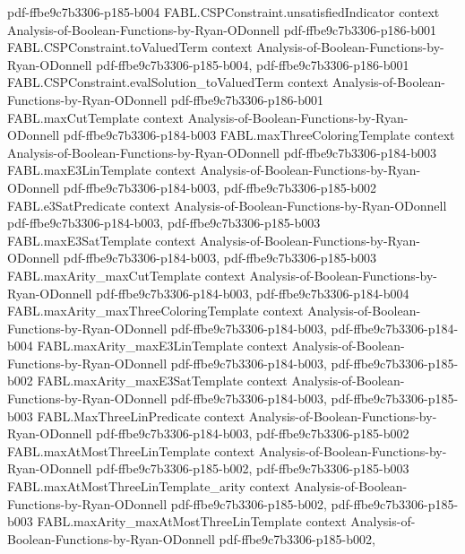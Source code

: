 \begin{theorem}
  {pdf-ffbe9c7b3306-p185-b004}
\proofstep
  {FABL.CSPConstraint.unsatisfiedIndicator}
  {context}
  {Analysis-of-Boolean-Functions-by-Ryan-ODonnell}
  {pdf-ffbe9c7b3306-p186-b001}
\proofstep
  {FABL.CSPConstraint.toValuedTerm}
  {context}
  {Analysis-of-Boolean-Functions-by-Ryan-ODonnell}
  {pdf-ffbe9c7b3306-p185-b004,
    pdf-ffbe9c7b3306-p186-b001}
\proofstep
  {FABL.CSPConstraint.evalSolution_toValuedTerm}
  {context}
  {Analysis-of-Boolean-Functions-by-Ryan-ODonnell}
  {pdf-ffbe9c7b3306-p186-b001}
\proofstep
  {FABL.maxCutTemplate}
  {context}
  {Analysis-of-Boolean-Functions-by-Ryan-ODonnell}
  {pdf-ffbe9c7b3306-p184-b003}
\proofstep
  {FABL.maxThreeColoringTemplate}
  {context}
  {Analysis-of-Boolean-Functions-by-Ryan-ODonnell}
  {pdf-ffbe9c7b3306-p184-b003}
\proofstep
  {FABL.maxE3LinTemplate}
  {context}
  {Analysis-of-Boolean-Functions-by-Ryan-ODonnell}
  {pdf-ffbe9c7b3306-p184-b003,
    pdf-ffbe9c7b3306-p185-b002}
\proofstep
  {FABL.e3SatPredicate}
  {context}
  {Analysis-of-Boolean-Functions-by-Ryan-ODonnell}
  {pdf-ffbe9c7b3306-p184-b003,
    pdf-ffbe9c7b3306-p185-b003}
\proofstep
  {FABL.maxE3SatTemplate}
  {context}
  {Analysis-of-Boolean-Functions-by-Ryan-ODonnell}
  {pdf-ffbe9c7b3306-p184-b003,
    pdf-ffbe9c7b3306-p185-b003}
\proofstep
  {FABL.maxArity_maxCutTemplate}
  {context}
  {Analysis-of-Boolean-Functions-by-Ryan-ODonnell}
  {pdf-ffbe9c7b3306-p184-b003,
    pdf-ffbe9c7b3306-p184-b004}
\proofstep
  {FABL.maxArity_maxThreeColoringTemplate}
  {context}
  {Analysis-of-Boolean-Functions-by-Ryan-ODonnell}
  {pdf-ffbe9c7b3306-p184-b003,
    pdf-ffbe9c7b3306-p184-b004}
\proofstep
  {FABL.maxArity_maxE3LinTemplate}
  {context}
  {Analysis-of-Boolean-Functions-by-Ryan-ODonnell}
  {pdf-ffbe9c7b3306-p184-b003,
    pdf-ffbe9c7b3306-p185-b002}
\proofstep
  {FABL.maxArity_maxE3SatTemplate}
  {context}
  {Analysis-of-Boolean-Functions-by-Ryan-ODonnell}
  {pdf-ffbe9c7b3306-p184-b003,
    pdf-ffbe9c7b3306-p185-b003}
\proofstep
  {FABL.MaxThreeLinPredicate}
  {context}
  {Analysis-of-Boolean-Functions-by-Ryan-ODonnell}
  {pdf-ffbe9c7b3306-p184-b003,
    pdf-ffbe9c7b3306-p185-b002}
\proofstep
  {FABL.maxAtMostThreeLinTemplate}
  {context}
  {Analysis-of-Boolean-Functions-by-Ryan-ODonnell}
  {pdf-ffbe9c7b3306-p185-b002,
    pdf-ffbe9c7b3306-p185-b003}
\proofstep
  {FABL.maxAtMostThreeLinTemplate_arity}
  {context}
  {Analysis-of-Boolean-Functions-by-Ryan-ODonnell}
  {pdf-ffbe9c7b3306-p185-b002,
    pdf-ffbe9c7b3306-p185-b003}
\proofstep
  {FABL.maxArity_maxAtMostThreeLinTemplate}
  {context}
  {Analysis-of-Boolean-Functions-by-Ryan-ODonnell}
  {pdf-ffbe9c7b3306-p185-b002,
}
\end{theorem}
